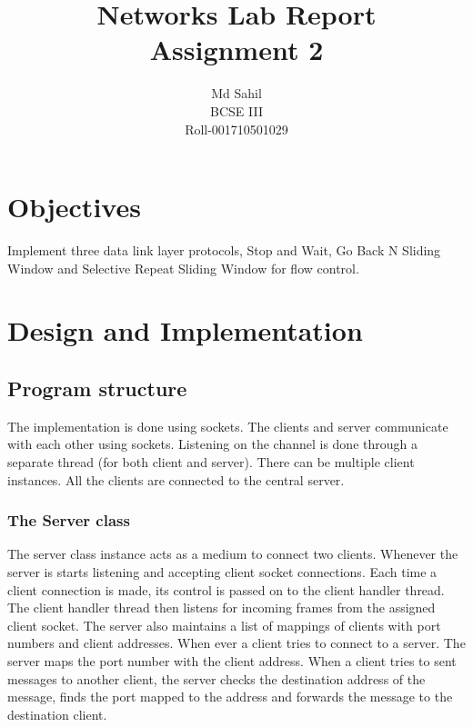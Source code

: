 \documentclass[14pt,titlepage, a4paper]{extarticle}
\title{Networks Lab Report\\Assignment 2}
\author{Md Sahil\\BCSE III\\Roll-001710501029}
\date{}
\begin{document}
{\maketitle}

\section{Objectives}
Implement three data link layer protocols, 
Stop and Wait, 
Go Back N Sliding Window 
and Selective Repeat Sliding Window for flow control.

\section{Design and Implementation}

\subsection{Program structure}
The implementation is done using sockets.
The clients and server communicate with each other using sockets.
Listening on the channel is done through a separate 
thread (for both client and server).
There can be multiple client instances. All the clients are connected to the
central server.


\subsubsection{The Server class}
The server class instance acts as a medium to connect two clients. 
Whenever the server is starts listening and accepting client socket
connections. Each time a client connection is made, its control is
passed on to the client handler thread. The client handler thread then 
listens for incoming frames from the assigned client socket.
The server also maintains a list of mappings of clients with port 
numbers and client addresses. When ever a client tries to connect to a server. 
The server maps the port number with the client address.
When a client tries to sent messages to another client, the server checks the
destination address of the message, finds the port mapped to the address
and forwards the message to the destination client.
\par\null\par
{}
\end{document}
